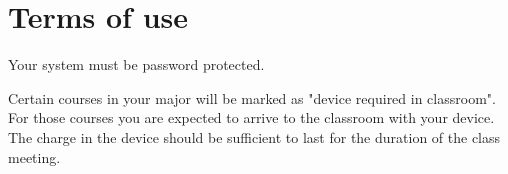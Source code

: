 \section{Terms of use}

Your system must be password protected.

Certain courses in your major will be marked as "device required in classroom". For those courses you are expected to arrive to the classroom with your device. The charge in the device should be sufficient to last for the duration of the class meeting.